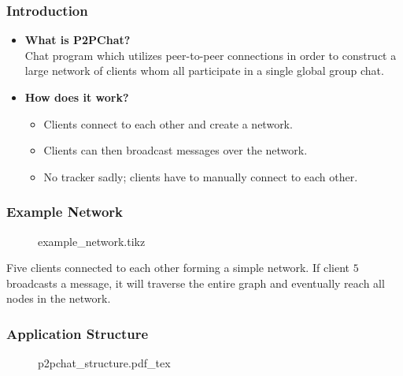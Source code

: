 \begin{frame}
  \frametitle{Introduction}
  \begin{itemize}
    \item \textbf{What is P2PChat?}\\
      Chat program which utilizes peer-to-peer connections in order to construct a large network of clients whom all participate in a single global group chat.
    \item \textbf{How does it work?}
      \begin{itemize}
        \item Clients connect to each other and create a network.
        \item Clients can then broadcast messages over the network.
        \item No tracker sadly; clients have to manually connect to each other.
      \end{itemize}
  \end{itemize}
\end{frame}

\begin{frame}
  \frametitle{Example Network}
  \begin{figure}
    \centering
    {example_network.tikz}
  \end{figure}

  Five clients connected to each other forming a simple network. If client $5$ broadcasts a message, it will traverse the entire graph and eventually reach all nodes in the network.
\end{frame}

\begin{frame}
  \frametitle{Application Structure}
  \begin{figure}
    \def\svgwidth{\textwidth}
    {p2pchat_structure.pdf_tex}
  \end{figure}
\end{frame}

